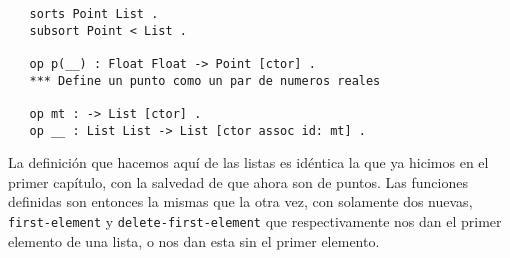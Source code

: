 {\codesize
\begin{verbatim}
   sorts Point List .
   subsort Point < List .

   op p(__) : Float Float -> Point [ctor] .
   *** Define un punto como un par de numeros reales

   op mt : -> List [ctor] .
   op __ : List List -> List [ctor assoc id: mt] . 
\end{verbatim}
}

La definición que hacemos aquí de las listas es idéntica la que ya hicimos en el primer capítulo, con la salvedad de que ahora son de puntos. Las funciones definidas son entonces la mismas que la otra vez, con solamente dos nuevas, \texttt{first-element} y \texttt{delete-first-element} que respectivamente nos dan el primer elemento de una lista, o nos dan esta sin el primer elemento.\par

